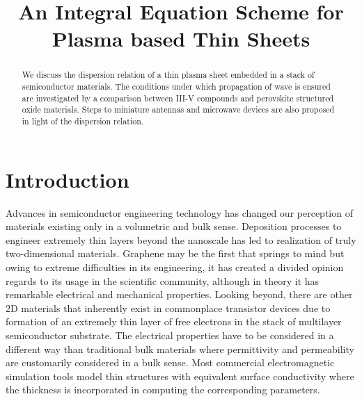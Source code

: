 \documentclass[conference, 10pt]{IEEEtran}
\renewcommand{\^}{\hat}  %
\begin{document}
\title{An Integral Equation Scheme for Plasma based Thin Sheets}


\author{
\and
{}
}
\maketitle


%
\begin{abstract}
  We discuss the dispersion relation of a thin plasma sheet embedded in a stack of semiconductor materials. The conditions under which propagation of wave is ensured are investigated by a comparison between III-V compounds and perovskite structured oxide materials. Steps to miniature antennas and microwave devices are also proposed in light of the dispersion relation.
\end{abstract}

\IEEEpeerreviewmaketitle
\section{Introduction}
Advances in semiconductor engineering technology has changed our perception of materials existing only in a volumetric and bulk sense. Deposition processes to engineer extremely thin layers beyond the nanoscale has led to realization of truly two-dimensional materials. Graphene may be the first that springs to mind but owing to extreme difficulties in its engineering, it has created a divided opinion regards to its usage in the scientific community, although in theory it has remarkable electrical and mechanical properties. Looking beyond, there are other 2D materials that inherently exist in commonplace transistor devices due to formation of an extremely thin layer of free electrons in the stack of multilayer semiconductor substrate. The electrical properties have to be considered in a different way than traditional bulk materials where permittivity and permeability are customarily considered in a bulk sense. Most commercial electromagnetic simulation tools model thin structures with equivalent surface conductivity where the thickness is incorporated in computing the corresponding parameters.
\end{document}
